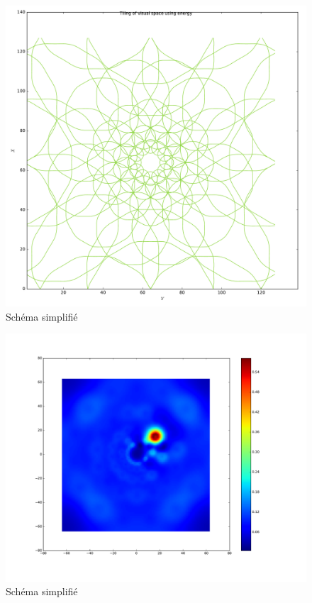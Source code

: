 \begin{figure}[th]
\centering
\includegraphics[scale=0.4]{Figures/logpol_energy_filter}
\decoRule
\caption[Figure]{Schéma simplifié}
\label{fig:energy_filter}
\end{figure}

\begin{figure}[th]
\centering
\includegraphics[scale=0.4]{Figures/accuracy_128_LP}
\decoRule
\caption[Figure]{Schéma simplifié}
\label{fig:accuracy_128_LP}
\end{figure}

